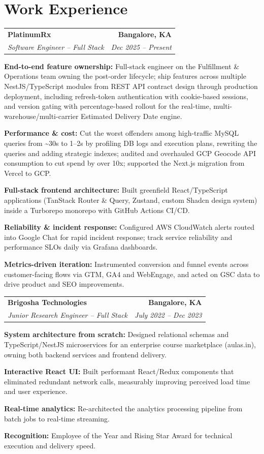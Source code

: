\documentclass[a4paper,10pt]{article}
\makeatletter
\newcommand{\heading}[4]{%
  \begin{tabular*}{\textwidth}{@{}l@{\extracolsep{\fill}}r@{}}
    \textbf{#1} & \textbf{#2} \\
    \textit{#3} & \textit{#4} \\
  \end{tabular*}\vspace{2pt}}
\makeatother
\begin{document}
\section{Work Experience}
\heading{PlatinumRx}{Bangalore, KA}{Software Engineer -- Full Stack}{Dec 2025 -- Present}
\begin{bullets}\small
  \item \textbf{End-to-end feature ownership:} Full-stack engineer on the Fulfillment \& Operations team owning the post-order lifecycle; ship features across multiple NestJS/TypeScript modules from REST API contract design through production deployment, including refresh-token authentication with cookie-based sessions, and version gating with percentage-based rollout for the real-time, multi-warehouse/multi-carrier Estimated Delivery Date engine.
  \item \textbf{Performance \& cost:} Cut the worst offenders among high-traffic MySQL queries from \textasciitilde30s to 1--2s by profiling DB logs and execution plans, rewriting the queries and adding strategic indexes; audited and overhauled GCP Geocode API consumption to cut spend by over 10x; supported the Next.js migration from Vercel to GCP.
  \item \textbf{Full-stack frontend architecture:} Built greenfield React/TypeScript applications (TanStack Router \& Query, Zustand, custom Shadcn design system) inside a Turborepo monorepo with GitHub Actions CI/CD.
  \item \textbf{Reliability \& incident response:} Configured AWS CloudWatch alerts routed into Google Chat for rapid incident response; track service reliability and performance SLOs daily via Grafana dashboards.
  \item \textbf{Metrics-driven iteration:} Instrumented conversion and funnel events across customer-facing flows via GTM, GA4 and WebEngage, and acted on GSC data to drive product and SEO improvements.
\end{bullets}


\vspace{3pt}
\heading{Brigosha Technologies}{Bangalore, KA}{Junior Research Engineer -- Full Stack}{July 2022 -- Dec 2023}
\begin{bullets}\small
  \item \textbf{System architecture from scratch:} Designed relational schemas and TypeScript/NestJS microservices for an enterprise course marketplace (aulas.in), owning both backend services and frontend delivery.
  \item \textbf{Interactive React UI:} Built performant React/Redux components that eliminated redundant network calls, measurably improving perceived load time and user experience.
  \item \textbf{Real-time analytics:} Re-architected the analytics processing pipeline from batch jobs to real-time streaming.
  \item \textbf{Recognition:} Employee of the Year and Rising Star Award for technical execution and delivery speed.
\end{bullets}
\end{document}

